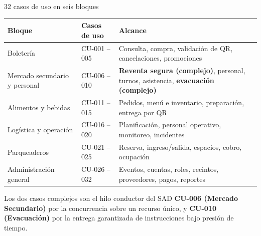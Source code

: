 \documentclass[aspectratio=169,10pt,xcolor={table}]{beamer}
\begin{document}
\begin{frame}{32 casos de uso en seis bloques}
  \footnotesize
  \begin{tabular}{L{3.4cm}C{2.1cm}L{7.2cm}}
    \toprule
    \textbf{Bloque} & \textbf{Casos de uso} & \textbf{Alcance} \\
    \midrule
    Boletería & CU-001 -- 005 & Consulta, compra, validación de QR, cancelaciones, promociones \\
    Mercado secundario y personal & CU-006 -- 010 & \textbf{Reventa segura (complejo)}, personal,
      turnos, asistencia, \textbf{evacuación (complejo)} \\
    Alimentos y bebidas & CU-011 -- 015 & Pedidos, menú e inventario, preparación, entrega por QR \\
    Logística y operación & CU-016 -- 020 & Planificación, personal operativo, monitoreo, incidentes \\
    Parqueaderos & CU-021 -- 025 & Reserva, ingreso/salida, espacios, cobro, ocupación \\
    Administración general & CU-026 -- 032 & Eventos, cuentas, roles, recintos, proveedores,
      pagos, reportes \\
    \bottomrule
  \end{tabular}

  \vspace{0.8em}
  \begin{alertblock}{Los dos casos complejos son el hilo conductor del SAD}
    \textbf{CU-006 (Mercado Secundario)} por la concurrencia sobre un recurso único, y
    \textbf{CU-010 (Evacuación)} por la entrega garantizada de instrucciones bajo presión de tiempo.
  \end{alertblock}
\end{frame}
\end{document}
